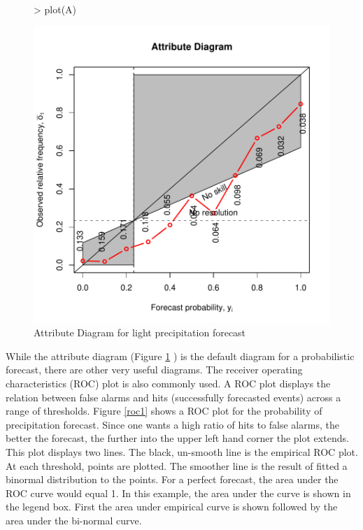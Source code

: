 \documentclass{article}
\begin{document}
\begin {center}
\begin{figure}[H]
\begin{Schunk}
\begin{Sinput}
> plot(A)
\end{Sinput}
\end{Schunk}
\includegraphics{verification-004}
\caption{\label{att.diag} Attribute Diagram for light precipitation forecast}
\end{figure}
\end{center}    

While the  attribute diagram (Figure \ref{att.diag} ) is the default diagram
for a probabilistic forecast, there are other very useful diagrams.
The receiver operating characteristics (ROC) plot is also commonly
used.  A ROC plot displays the relation between false alarms and hits
(successfully forecasted events) across a range of thresholds. Figure
\ref{roc1}  shows a ROC plot for the probability of precipitation
forecast.  Since one wants a high ratio of hits to false alarms, the
better the forecast, the further into the upper left hand corner the
plot extends.  This plot displays two lines.  The black, un-smooth
line is the empirical ROC plot.  At each threshold, points are
plotted.  The smoother line is the result of fitted a binormal
distribution to the points.  For a perfect forecast, the area under
the ROC curve would equal 1.  In this example, the area under the
curve is shown in the legend box.  First the area under empirical
curve is shown followed by the area under the bi-normal curve. 
\end{document}
